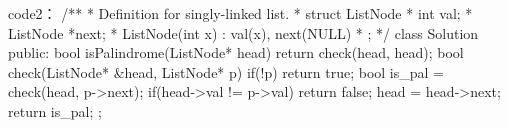 code2：
/**
 * Definition for singly-linked list.
 * struct ListNode {
 *     int val;
 *     ListNode *next;
 *     ListNode(int x) : val(x), next(NULL) {}
 * };
 */
class Solution {
public:
    bool isPalindrome(ListNode* head) {
        return check(head, head);
    }
    bool check(ListNode* &head, ListNode* p)
    {
        if(!p) return true;
        bool is_pal = check(head, p->next);
        if(head->val != p->val)
            return false;
        head = head->next;
        return is_pal;
    }
};